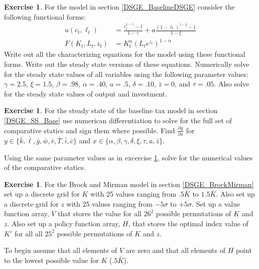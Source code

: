 \documentclass[letterpaper,12pt]{article}
\theoremstyle{definition}
\newtheorem{exercise}[theorem]{Exercise}
\begin{document}
\begin{spacing}{1.5}
	\begin{exercise} \label{DSGE_HW_CES}
		For the model in section \ref{DSGE_BaselineDSGE} consider the following functional forms:
		\begin{equation}\label{DSGE_HW_CES_eq01}
		\begin{split}
		u(c_t,\ell_t) & = \frac{c^{1-\gamma}_t -1}{1-\gamma}+ a \frac{(1-\ell_t)^{1-\xi}-1}{1-\xi}      \\
		F(K_t,L_t,z_t) & = K^{\alpha}_t (L_te^{z_t})^{1-\alpha}  \nonumber
		\end{split}
		\end{equation}
		Write out all the characterizing equations for the model using these functional forms.  {}Write out the steady state versions of these equations.  Numerically solve for the steady state values of all variables using the following parameter values: $\gamma = 2.5$, $\xi = 1.5$,  $\beta = .98$, $\alpha = .40$, $a=.5$, $\delta = .10$, $\bar z = 0$, and $\tau = .05$.  Also solve for the steady state values of output and investment.
	\end{exercise}

	\begin{exercise} \label{DSGE_HW_Base_TotalDiff}
		For the steady state of the baseline tax model in section \ref{DSGE_SS_Base} use numerican differentiation to solve for the full set of comparative statics and sign them where possible.  Find $\frac{\partial y}{\partial x}$ for $y\in\{\bar k, \bar \ell, \bar y, \bar w, \bar r, \bar T, \bar i, \bar c \}$ and $x\in\{\alpha, \beta, \gamma, \delta, \xi, \tau, a, \bar z\}$.

		Using the same parameter values as in excercise \ref{DSGE_HW_CES}, solve for the numerical values of the comparative statics.
	\end{exercise}

	\begin{exercise} \label{DSGE_HW_BM_Grid}
		For the Brock and Mirman model in section \eqref{DSGE_BrockMirman} set up a discrete grid for $K$ with 25 values ranging from $.5 \bar K$ to $1.5 \bar K$.  Also set up a discrete grid for $z$ with 25 values ranging from $-5\sigma$ to $+5\sigma$.  Set up a value function array, $V$ that stores the value for all $26^2$ possible permutations of $K$ and $z$.  Also set up a policy function array, $H$, that stores the optimal index value of $K'$ for all all $25^2$ possible permutations of $K$ and $z$.

		To begin assume that all elements of $V$ are zero and that all elements of $H$ point to the lowest possible value for $K$ ($.5 \bar K$).


\end{exercise}
\end{spacing}
\end{document}
